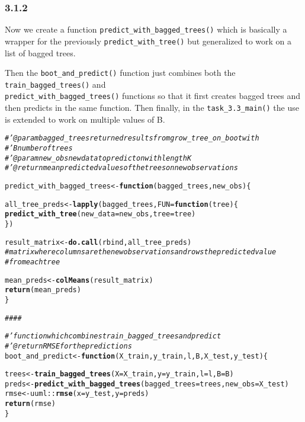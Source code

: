 \documentclass[10pt, a4paper, english]{article}\usepackage[]{graphicx}\usepackage[dvipsnames]{xcolor}
\makeatletter
\newcommand{\hlcom}[1]{\textcolor[rgb]{0.678,0.584,0.686}{\textit{#1}}}%
\newcommand{\hlopt}[1]{\textcolor[rgb]{0,0,0}{#1}}%
\newcommand{\hlstd}[1]{\textcolor[rgb]{0.345,0.345,0.345}{#1}}%
\newcommand{\hlkwa}[1]{\textcolor[rgb]{0.161,0.373,0.58}{\textbf{#1}}}%
\newcommand{\hlkwb}[1]{\textcolor[rgb]{0.69,0.353,0.396}{#1}}%
\newcommand{\hlkwc}[1]{\textcolor[rgb]{0.333,0.667,0.333}{#1}}%
\newcommand{\hlkwd}[1]{\textcolor[rgb]{0.737,0.353,0.396}{\textbf{#1}}}%
\newenvironment{kframe}{%
 \def\at@end@of@kframe{}%
 \ifinner\ifhmode%
  \def\at@end@of@kframe{\end{minipage}}%
  \begin{minipage}{\columnwidth}%
 \fi\fi%
 \def\FrameCommand##1{\hskip\@totalleftmargin \hskip-\fboxsep
 \colorbox{shadecolor}{##1}\hskip-\fboxsep
     \hskip-\linewidth \hskip-\@totalleftmargin \hskip\columnwidth}%
 \MakeFramed {\advance\hsize-\width
   \@totalleftmargin\z@ \linewidth\hsize
   \@setminipage}}%
 {\par\unskip\endMakeFramed%
 \at@end@of@kframe}
\newenvironment{knitrout}{}{} %
\makeatother
\begin{document}
\subsubsection{3.1.2}
Now we create a function \texttt{predict\_with\_bagged\_trees()} which is basically a wrapper for the previously \texttt{predict\_with\_tree()} but generalized to work on a list of bagged trees.

Then the \texttt{boot\_and\_predict()} function just combines both the \texttt{train\_bagged\_trees()} and \\ \texttt{predict\_with\_bagged\_trees()} functions so that it first creates bagged trees and then predicts in the same function. Then finally, in the \texttt{task\_3.3\_main()} the use is extended to work on multiple values of B.
\begin{knitrout}
\color{fgcolor}\begin{kframe}
\begin{alltt}
\hlcom{#' @param bagged_trees returned results from grow_tree_on_boot with }
\hlcom{#' B number of trees}
\hlcom{#' @param new_obs new data to predict on with length K}
\hlcom{#' @return mean predicted values of the trees on new observations}

\hlstd{predict_with_bagged_trees} \hlkwb{<-} \hlkwa{function}\hlstd{(}\hlkwc{bagged_trees}\hlstd{,} \hlkwc{new_obs}\hlstd{)\{}

  \hlstd{all_tree_preds} \hlkwb{<-} \hlkwd{lapply}\hlstd{(bagged_trees,} \hlkwc{FUN} \hlstd{=} \hlkwa{function}\hlstd{(}\hlkwc{tree}\hlstd{)\{}
  \hlkwd{predict_with_tree}\hlstd{(}\hlkwc{new_data} \hlstd{= new_obs,} \hlkwc{tree}\hlstd{=tree)}
\hlstd{\})}

\hlstd{result_matrix} \hlkwb{<-} \hlkwd{do.call}\hlstd{(rbind, all_tree_preds)}
\hlcom{#matrix where columns are the new observations and rows the predicted value}
\hlcom{#from each tree}

\hlstd{mean_preds} \hlkwb{<-} \hlkwd{colMeans}\hlstd{(result_matrix)}
\hlkwd{return}\hlstd{(mean_preds)}
\hlstd{\}}


\hlcom{####}

\hlcom{#' function which combines train_bagged_trees and predict}
\hlcom{#'  @return RMSE for the predictions}
\hlstd{boot_and_predict} \hlkwb{<-} \hlkwa{function}\hlstd{(}\hlkwc{X_train}\hlstd{,}\hlkwc{y_train}\hlstd{,}\hlkwc{l}\hlstd{,} \hlkwc{B}\hlstd{,} \hlkwc{X_test}\hlstd{,} \hlkwc{y_test}\hlstd{)\{}

  \hlstd{trees} \hlkwb{<-} \hlkwd{train_bagged_trees}\hlstd{(}\hlkwc{X}\hlstd{=X_train,} \hlkwc{y}\hlstd{=y_train,} \hlkwc{l}\hlstd{=l,} \hlkwc{B}\hlstd{=B)}
  \hlstd{preds} \hlkwb{<-} \hlkwd{predict_with_bagged_trees}\hlstd{(}\hlkwc{bagged_trees} \hlstd{= trees,} \hlkwc{new_obs}\hlstd{=X_test)}
  \hlstd{rmse} \hlkwb{<-} \hlstd{uuml}\hlopt{::}\hlkwd{rmse}\hlstd{(}\hlkwc{x}\hlstd{= y_test,} \hlkwc{y}\hlstd{= preds)}
  \hlkwd{return}\hlstd{(rmse)}
\hlstd{\}}



\end{alltt}
\end{kframe}
\end{knitrout}
\end{document}
